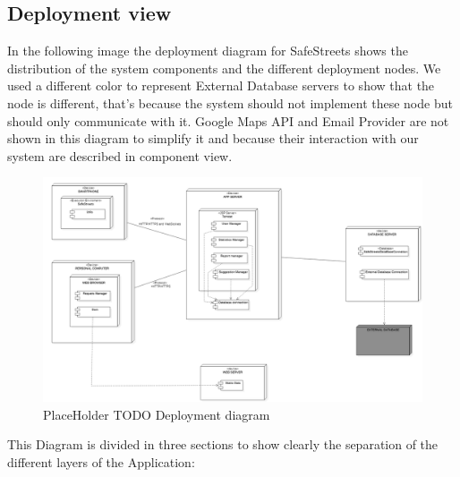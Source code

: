 \subsection{Deployment view}
In the following image the deployment diagram for SafeStreets shows the distribution of the system components and the different deployment nodes. We used a different color to represent External Database servers to show that the node is different, that's because the system should not implement these node but should only communicate with it.
Google Maps API and Email Provider are not shown in this diagram to simplify it and because their interaction with our system are described in component view.
\newline
\begin{figure}[H]
\centering
\includegraphics[width=\textwidth]{Images/Deployment.png}
\caption{\label{fig:ComWI}PlaceHolder TODO Deployment diagram}
\end{figure}
This Diagram is divided in three sections to show clearly the separation of the different layers of the Application:
